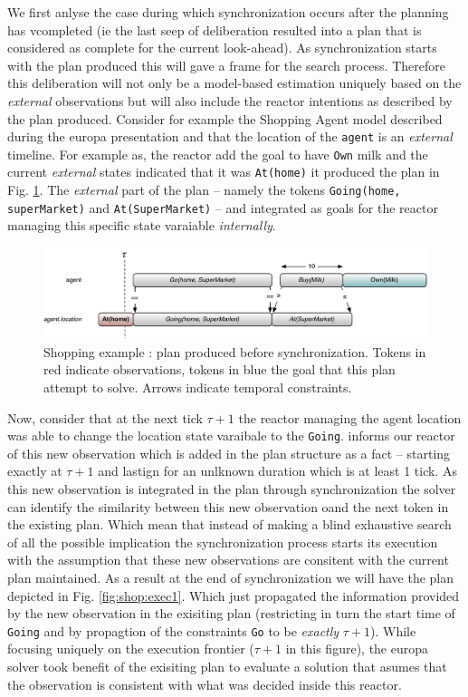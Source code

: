 We first anlyse the case during which synchronization occurs after the
planning has vcompleted (ie the last seep of deliberation resulted
into a plan that is considered as complete for the current
look-ahead). As synchronization starts with the plan produced this
will gave a frame for the search process. Therefore this deliberation
will not only be a model-based estimation uniquely based on the {\em
  external} observations but will also include the reactor intentions
as described by the plan produced. Consider for example the Shopping
Agent model described during the europa presentation and that the
location of the \texttt{agent} is an {\em external} timeline. For
example as, the reactor add the goal to have \texttt{Own} milk and the
current {\em external} states indicated that it was \texttt{At(home)}
it produced the plan in Fig. \ref{fig:shop:exec0}. The {\em external}
part of the plan -- namely the tokens \texttt{Going(home,
  superMarket)} and \texttt{At(SuperMarket)} -- and integrated as
goals for the reactor managing this specific state varaiable {\em
  internally}.

\begin{figure}[!htb]
  \centering
  \includegraphics[width=0.7\columnwidth]{figs/shoping_exec_t0}
  \caption{Shopping example : plan produced before synchronization. 
    Tokens in red indicate observations, 
    tokens in blue the goal that this plan attempt to solve. Arrows
    indicate temporal constraints.}
  \label{fig:shop:exec0}
\end{figure}

Now, consider that at the next tick $\tau+1$ the reactor managing the
agent location was able to change the location state varaibale to the
\texttt{Going}. \rx informs our reactor of this new observation which
is added in the plan structure as a fact -- starting exactly at
$\tau+1$ and lastign for an unlknown duration which is at least 1
tick. As this new observation is integrated in the plan through
synchronization the solver can identify the similarity between this
new observation oand the next token in the existing plan. Which mean
that instead of making a blind exhaustive search of all the possible
implication the synchronization process starts its execution with the
assumption that these new observations are consitent with the current
plan maintained. As a result at the end of synchronization we will
have the plan depicted in Fig. \ref{fig:shop:exec1}. Which just
propagated the information provided by the new observation in the
exisiting plan (restricting in turn the start time of \texttt{Going}
and by propagtion of the constraints \texttt{Go} to be {\em exactly}
$\tau+1$). While focusing uniquely on the execution frontier ($\tau+1$
in this figure), the europa solver took benefit of the exisiting plan
to evaluate a solution that asumes that the observation is consistent
with what was decided inside this reactor.


